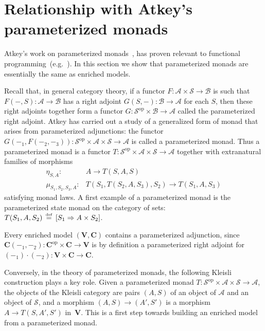 \documentclass{LMCS}
\newcommand{\VCat}{\fixedcatfont{V}} \newcommand{\CCat}{\fixedcatfont{C}} \newcommand{\DCat}{\fixedcatfont{D}}
\newcommand{\ltensor}[2]{#1 \cdot #2}
\newcommand{\fixedcatfont}{\mathbf}
\newcommand{\opcat}[1]{#1^{\mathrm{op}}}
\newcommand{\defeq}{\mathrel{\,\stackrel{\mbox{\tiny{$\mathrm{def}$}}}=\,}}
\begin{document}
\section{Relationship with Atkey's parameterized monads}



Atkey's work on parameterized monads~\cite{a-parammonad},
has proven relevant to 
functional programming~(e.g.~\cite[\S5.2]{kps-funwithtypefunctions}).
In this section we show that parameterized monads are essentially the same as 
enriched models.

\label{sec:parammonad}
\newcommand{\SCat}{\mathcal S}
\renewcommand{\ACat}{\mathcal A}
\newcommand{\BCat}{\mathcal B}


Recall that, in general category theory, if a functor 
$F: \ACat\times \SCat\to\BCat$ 
is such that $F(-,S):\ACat\to\BCat$ has a 
right adjoint $G(S,-):\BCat\to\ACat$ for each $S$,
then these right adjoints together form a 
functor $G:\opcat\SCat\times \BCat\to\ACat$
called the parameterized right adjoint.
Atkey has carried out a study of a generalized form of 
monad 
that arises from parameterized adjunctions:
the functor 
$G(-_1,F(-_2,-_3)):\opcat\SCat\times \ACat\times\SCat\to\ACat$
is called a parameterized monad.
Thus a parameterized monad is a functor 
$T:\opcat\SCat\times\ACat\times \SCat\to \ACat$ 
together with extranatural families of morphisms
\begin{align*}
\eta_{S,A}:&A\to T(S,A,S)
\\
\mu_{S_1,S_2,S_3,A}:&
T(S_1,T(S_2,A,S_3),S_2)
\to
T(S_1,A,S_3)
\end{align*}
satisfying monad laws.
A first example of a parameterized monad is the parameterized state
monad on the category of sets:
$T(S_1,A,S_2)\defeq [S_1\Rightarrow A\times S_2]$.

Every enriched model $(\VCat,\CCat)$ 
contains a parameterized adjunction, 
since $\CCat(-_1,-_2):\opcat\CCat\times \CCat\to\VCat$
is by definition a parameterized right adjoint 
for $\ltensor{(-_1)}{(-_2)} :\VCat\times\CCat\to\CCat$.

Conversely, in the theory of parameterized monads,
the following Kleisli construction \cite[Prop.~1]{a-parammonad}
plays a key role.
Given a parameterized monad $T:\opcat \SCat\times \ACat\times \SCat\to \ACat$, 
the objects of the Kleisli category are pairs 
$(A,S)$ of an object of $\ACat$ and an object of $\SCat$,
and a morphism
$(A,S)\to (A',S')$ is a morphism
$A\to T(S,A',S')$ in~$\VCat$.
This is a first step towards building an enriched model from a parameterized
monad.
\end{document}

